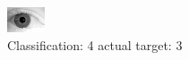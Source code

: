 \begin{figure}[h!]
\begin{center}
\includegraphics[width=0.60\columnwidth]{figures/ID2214_class_4_target_3.png}
\end{center}
\caption{ Classification: 4 actual target: 3}
\label{fig:ID2214_class_4_target_3}
\end{figure}
